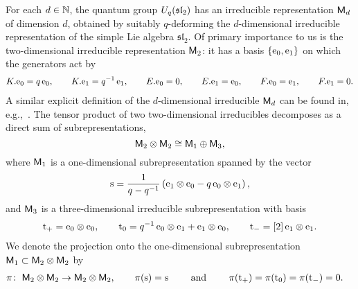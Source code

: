 \documentclass[oneside,english]{amsart}
\numberwithin{equation}{section}
\numberwithin{figure}{section}
\theoremstyle{plain}
\theoremstyle{plain}
\theoremstyle{plain}
\theoremstyle{remark}
\theoremstyle{plain}
\theoremstyle{plain}
\theoremstyle{plain}
\theoremstyle{plain}
\theoremstyle{plain}
\theoremstyle{plain}
\theoremstyle{plain}
\theoremstyle{plain}
\begin{document}
For each $d \in \mathbb{N}$, the quantum group
${U}_{q}(\mathfrak{sl}_{2})$ has an irreducible representation $\mathsf{M}_d$ of dimension $d$,
obtained by suitably $q$-deforming the $d$-dimensional irreducible representation
of the simple Lie algebra $\mathfrak{sl}_2$. Of primary importance to
us is the two-dimensional irreducible representation $\mathsf{M}_2$: it has a basis $\left\{ \mathrm{e}_0 , \mathrm{e}_1\right\}$
on which the generators act by
\begin{align*} 
K. \mathrm{e}_0 = q \, \mathrm{e}_0 , \qquad
K. \mathrm{e}_1 = q^{-1} \, \mathrm{e}_1 , \qquad
E. \mathrm{e}_0 = 0 , \qquad
E. \mathrm{e}_1 = \mathrm{e}_0 , \qquad
F. \mathrm{e}_0 = \mathrm{e}_1 , \qquad
F. \mathrm{e}_1 = 0 .
\end{align*}
A similar explicit definition of the $d$-dimensional irreducible
$\mathsf{M}_d$ can be found in, e.g.,~\cite{KP-conformally_covariant_boundary_correlation_functions_with_a_quantum_group}.
The tensor product of two two-dimensional irreducibles
decomposes as a direct sum of subrepresentations,
\[ \mathsf{M}_2 \otimes \mathsf{M}_2 \cong \mathsf{M}_1 \oplus \mathsf{M}_3 , \]
where $\mathsf{M}_1$ is a one-dimensional
subrepresentation spanned by the vector
\begin{align} \label{eq: singlet basis vector}
\Sbas %
= \frac{1}{q-q^{-1}}\left(\Wbas_{1}\tens\Wbas_{0}-q\,\Wbas_{0}\tens\Wbas_{1}\right),
\end{align}
and $\mathsf{M}_3$ is a three-dimensional irreducible subrepresentation with basis
\begin{align*}%
\TRbas_+ %
= \Wbas_{0}\tens\Wbas_{0},\qquad 
\TRbas_0 %
= q^{-1}\,\Wbas_{0}\tens\Wbas_{1} + \Wbas_{1}\tens\Wbas_{0},\qquad 
\TRbas_- %
= [2]\,\Wbas_{1}\tens\Wbas_{1} .
\end{align*}
We denote the projection onto the 
one-dimensional
subrepresentation
$\mathsf{M}_1 \subset \mathsf{M}_2 \otimes \mathsf{M}_2$ %
by
\begin{align*}
\pi\colon\; &\mathsf{M}_{2}\otimes\mathsf{M}_{2}\to\mathsf{M}_{2}\otimes\mathsf{M}_{2} , \qquad 
\pi(\mathrm{s})=\mathrm{s} \qquad \text{ and } \qquad
\pi(\mathrm{t}_{+}) = \pi(\mathrm{t}_{0}) = \pi(\mathrm{t}_{-}) = 0 .
\end{align*}
\end{document}
